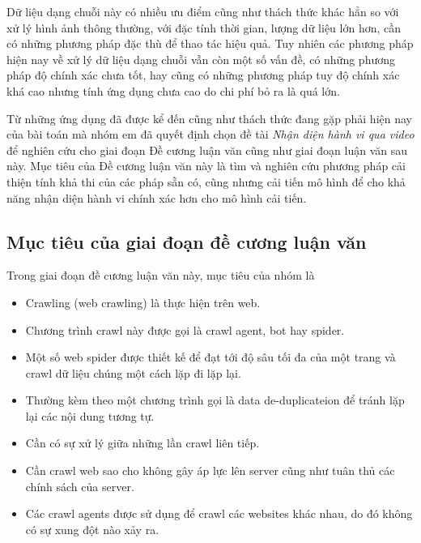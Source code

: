 Dữ liệu dạng chuỗi này có nhiều ưu điểm cũng như thách thức khác hẳn so với xử lý hình ảnh thông thường, với đặc tính thời gian, lượng dữ liệu lớn hơn,
cần có những phương pháp đặc thù để thao tác hiệu quả. Tuy nhiên các phương pháp hiện nay về xử lý dữ liệu dạng chuỗi vẫn còn một số vấn đề,
có những phương pháp độ chính xác chưa tốt, hay cũng có những phương pháp tuy độ chính xác khá cao nhưng tính ứng dụng chưa cao do chi phí bỏ ra là quá lớn.

Từ những ứng dụng đã được kể  đến cũng như thách thức đang gặp phải hiện nay của bài toán mà nhóm em đã quyết định chọn đề tài
\textit{Nhận diện hành vi qua video} để nghiên cứu cho giai đoạn Đề cương luận văn cũng như giai đoạn luận văn sau này.
Mục tiêu của Đề cương luận văn này là tìm và nghiên cứu phương pháp cải thiện tính khả thi của các pháp sẵn có, cũng nhưng cải tiến mô hình để cho khả năng
nhận diện hành vi chính xác hơn cho mô hình cải tiến.




\subsection{Mục tiêu của giai đoạn đề cương luận văn}
Trong giai đoạn đề cương luận văn này, mục tiêu của nhóm là
\begin{itemize}
    \item Crawling (web crawling) là thực hiện trên web.
    \item Chương trình crawl này được gọi là crawl agent, bot hay  spider.
    \item Một số web spider được thiết kế để đạt tới độ sâu tối đa của một trang và crawl dữ liệu chúng một cách lặp đi lặp lại.
    \item Thường kèm theo một chương trình gọi là data de-duplicateion để tránh lặp lại các nội dung tương tự.
    \item Cần có sự xử lý giữa những lần crawl liên tiếp.
    \item Cần crawl web sao cho không gây áp lực lên server cũng như tuân thủ các chính sách của server.
    \item Các crawl agents được sử dụng để crawl các websites khác nhau, do đó không có sự xung đột nào xảy ra.
\end{itemize}

